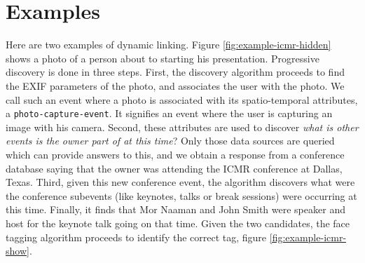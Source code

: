 \section{Examples}
Here are two examples of dynamic linking. Figure \ref{fig:example-icmr-hidden} shows a photo of a person about to starting his presentation. Progressive discovery is done in three steps. First, the discovery algorithm proceeds to find the EXIF parameters of the photo, and associates the user with the photo. We call such an event where a photo is associated with its spatio-temporal attributes, a \texttt{photo-capture-event}. It signifies an event where the user is capturing an image with his camera. Second, these attributes are used to discover \textit{what is other events is the owner part of at this time}? Only those data sources are queried which can provide answers to this, and we obtain a response from a conference database saying that the owner was attending the ICMR conference at Dallas, Texas. Third, given this new conference event, the algorithm discovers what were the conference subevents (like keynotes, talks or break sessions) were occurring at this time. Finally, it finds that Mor Naaman and John Smith were speaker and host for the keynote talk going on that time. Given the two candidates, the face tagging algorithm proceeds to identify the correct tag, figure \ref{fig:example-icmr-show}.


